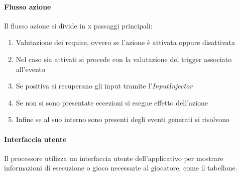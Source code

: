 \paragraph{Flusso azione} Il flusso azione si divide in x passaggi principali:
\begin{enumerate}
    \item Valutazione dei require, ovvero se l'azione è attivata oppure disattivata
    \item Nel caso sia attivati si procede con la valutazione del trigger associato all'evento
    \item Se positiva si recuperano gli input tramite l'\textit{InputInjector}
    \item Se non si sono presentate eccezioni si esegue effetto dell'azione
    \item Infine se al suo interno sono presenti degli eventi generati si risolvono
\end{enumerate}

\paragraph{Interfaccia utente} Il processore utilizza un interfaccia utente dell'applicativo per mostrare informazioni
di esecuzione o gioco necessarie al giocatore, come il tabellone.